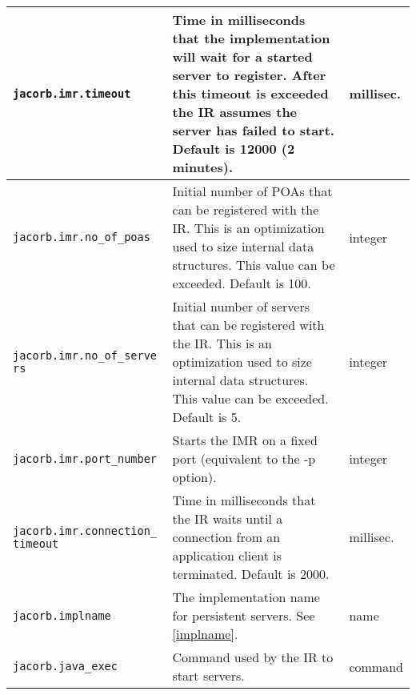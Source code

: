 \begin{small}
\begin{longtable}{|p{5cm}|p{9cm}|p{2cm}|}
\hline
\verb"jacorb.imr.timeout" & Time in milliseconds that the implementation will wait for a started server to register. After this timeout is exceeded the IR assumes the server has failed to start. Default is 12000 (2 minutes). & millisec. \\
\hline
\verb"jacorb.imr.no_of_poas" & Initial number of POAs that can be registered with the IR. This is an optimization used to size internal data structures. This value can be exceeded. Default is 100. & integer \\
\hline
\verb"jacorb.imr.no_of_serve"
\verb"rs" & Initial number of servers that can be registered with the IR. This is an optimization used to size internal data structures. This value can be exceeded. Default is 5. & integer \\
\hline
\verb"jacorb.imr.port_number" & Starts the IMR on a fixed port (equivalent to the -p option). & integer \\
\hline
\verb"jacorb.imr.connection_"
\verb"timeout" & Time in milliseconds that the IR waits until a connection from an application client is terminated. Default is 2000. & millisec. \\
\hline
\verb"jacorb.implname" & The implementation name for persistent servers. See \ref{implname}. & name \\
\hline
\verb"jacorb.java_exec" & Command used by the IR to start servers. & command \\
\hline
\end{longtable}
\end{small}


